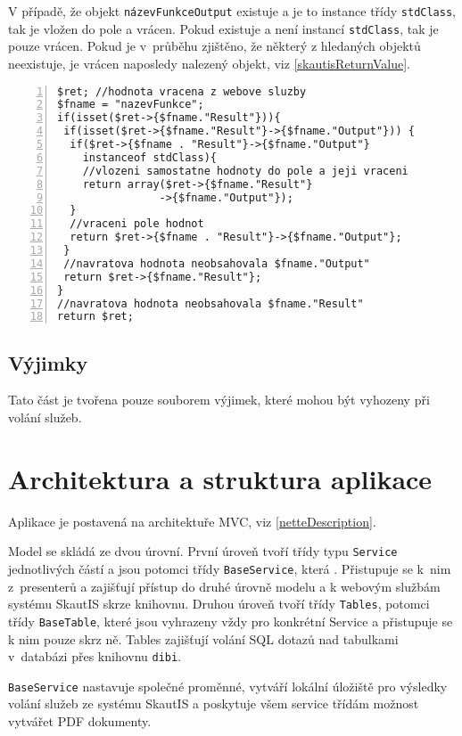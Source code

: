 \documentclass[thesis=B,czech]{FITthesis}[2012/04/27]
\begin{document}
V případě, že objekt \texttt{názevFunkceOutput} existuje a je to instance třídy \texttt{stdClass}, tak je vložen do pole a vrácen. Pokud existuje a není instancí \texttt{stdClass}, tak je pouze vrácen.
Pokud je v~průběhu zjištěno, že některý z hledaných objektů neexistuje, je vrácen naposledy nalezený objekt, viz \ref{skautisReturnValue}.

\begin{lstlisting}[caption=zpracování návratové hodnoty od webové služby, label=skautisReturnValue, numbers=left]
$ret; //hodnota vracena z webove sluzby
$fname = "nazevFunkce";
if(isset($ret->{$fname."Result"})){
 if(isset($ret->{$fname."Result"}->{$fname."Output"})) {
  if($ret->{$fname . "Result"}->{$fname."Output"}
  	instanceof stdClass){
    //vlozeni samostatne hodnoty do pole a jeji vraceni
    return array($ret->{$fname."Result"}
    			->{$fname."Output"});
  }
  //vraceni pole hodnot
  return $ret->{$fname . "Result"}->{$fname."Output"};
 }
 //navratova hodnota neobsahovala $fname."Output"
 return $ret->{$fname."Result"};
}
//navratova hodnota neobsahovala $fname."Result"
return $ret;
\end{lstlisting}

\subsection{Výjimky}
Tato část je tvořena pouze souborem výjimek, které mohou být vyhozeny při volání služeb.

\section{Architektura a struktura aplikace}
Aplikace je postavená na architektuře MVC, viz \ref{netteDescription}.

Model se skládá ze dvou úrovní. První úroveň tvoří třídy typu \texttt{Service} jednotlivých částí a jsou potomci třídy \texttt{BaseService}, která . Přistupuje se k~nim z~presenterů a zajišťují přístup do druhé úrovně modelu a k webovým službám systému SkautIS skrze knihovnu. Druhou úroveň tvoří třídy \texttt{Tables}, potomci třídy \texttt{BaseTable}, které jsou vyhrazeny vždy pro konkrétní Service a přistupuje se k nim pouze skrz ně. Tables zajišťují volání SQL dotazů nad tabulkami v~databázi přes knihovnu \texttt{dibi}.

\texttt{BaseService} nastavuje společné proměnné, vytváří lokální úložiště pro výsledky volání služeb ze systému SkautIS a poskytuje všem service třídám možnost vytvářet PDF dokumenty.
\end{document}
